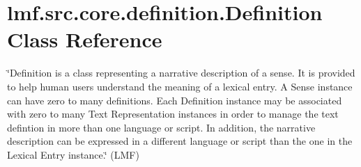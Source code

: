 \hypertarget{classlmf_1_1src_1_1core_1_1definition_1_1_definition}{\section{lmf.\+src.\+core.\+definition.\+Definition Class Reference}
\label{classlmf_1_1src_1_1core_1_1definition_1_1_definition}
}


\char`\"{}\+Definition is a class representing a narrative description of a sense. It is provided to help human users understand the meaning of a lexical entry. A Sense instance can have zero to many definitions. Each Definition instance may be associated with zero to many Text Representation instances in order to manage the text defintion in more than one language or script. In addition, the narrative description can be expressed in a different language or script than the one in the Lexical Entry instance.\char`\"{} (L\+M\+F)  


